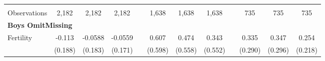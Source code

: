 \begin{landscape}
\begin{table}[htpb!]
\begin{center}
\begin{tabular}{lcccp{2mm}cccp{2mm}ccc}
\begin{footnotesize}\end{footnotesize}&\begin{footnotesize}\end{footnotesize}&\begin{footnotesize}\end{footnotesize}&\begin{footnotesize}\end{footnotesize}&\begin{footnotesize}\end{footnotesize}&\begin{footnotesize}\end{footnotesize}&\begin{footnotesize}\end{footnotesize}&\begin{footnotesize}\end{footnotesize}&\begin{footnotesize}\end{footnotesize}&\begin{footnotesize}\end{footnotesize}&\begin{footnotesize}\end{footnotesize}&\begin{footnotesize}\end{footnotesize}\\Observations&2,182&2,182&2,182&&1,638&1,638&1,638&&735&735&735\\
\multicolumn{12}{l}{\textbf{Boys OmitMissing}}\\ 
Fertility&-0.113&-0.0588&-0.0559&&0.607&0.474&0.343&&0.335&0.347&0.254\\
&(0.188)&(0.183)&(0.171)&&(0.598)&(0.558)&(0.552)&&(0.290)&(0.296)&(0.218)\\

\end{tabular}
\end{center}
\end{table}
\end{landscape}
